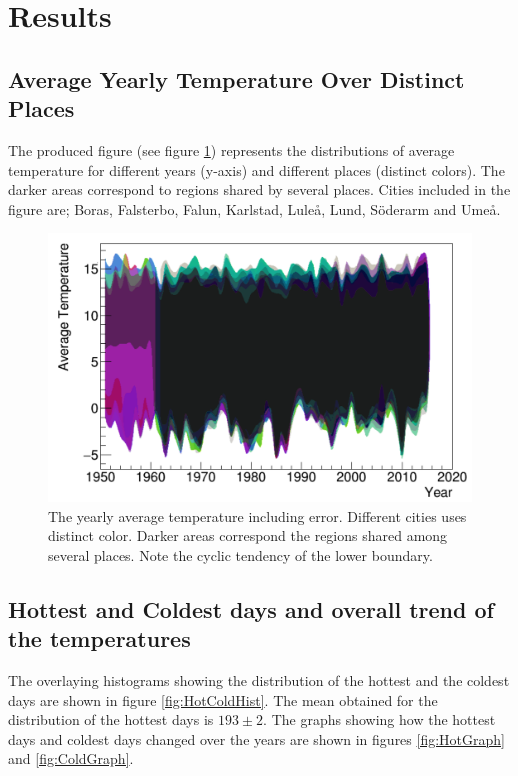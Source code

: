 \documentclass[a4paper]{article}
\begin{document}
\section{Results}\label{sec:Results}

\subsection{Average Yearly Temperature Over Distinct Places}

The produced figure (see figure \ref{fig:johan}) represents the distributions of average temperature for different years (y-axis) and different places (distinct colors). The darker areas correspond to regions shared by several places. Cities included in the figure are; Boras, Falsterbo, Falun, Karlstad, Luleå, Lund, Söderarm and Umeå.

\begin{figure}[H]
\begin{center}
\includegraphics[scale=.3]{2.png}
\caption{The yearly average temperature including error. Different cities uses distinct color. Darker areas correspond the regions shared among several places. Note the cyclic tendency of the lower boundary.}
\label{fig:johan}
\end{center}
\end{figure}


\subsection{Hottest and Coldest days and overall trend of the temperatures}

The overlaying histograms showing the distribution of the hottest and the coldest days are shown in figure \ref{fig:HotColdHist}.
The mean obtained for the distribution of the hottest days is $193 \pm 2$. The graphs showing how the hottest days and coldest days changed over the years are shown in figures  \ref{fig:HotGraph} and \ref{fig:ColdGraph}. 
\end{document}
